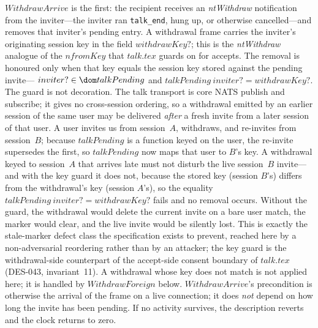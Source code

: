 \documentclass[a4paper,10pt,fleqn]{article}
\begin{document}
$WithdrawArrive$ is the first: the recipient receives an \emph{ntWithdraw}
notification from the inviter---the inviter ran \texttt{talk\_end}, hung up,
or otherwise cancelled---and removes that inviter's pending entry.  A
withdrawal frame carries the inviter's originating session key in the field
$withdrawKey?$; this is the \emph{ntWithdraw} analogue of the $nfromKey$ that
$talk.tex$ guards on for accepts.  The removal is honoured only when that key
equals the session key stored against the pending invite---%
$inviter? \in \dom talkPending$ and $talkPending~inviter? = withdrawKey?$.
The guard is not decoration.  The talk transport is core NATS publish and
subscribe; it gives no cross-session ordering, so a withdrawal emitted by an
earlier session of the same user may be delivered \emph{after} a fresh invite
from a later session of that user.  A user invites us from session~$A$,
withdraws, and re-invites from session~$B$; because $talkPending$ is a
function keyed on the user, the re-invite supersedes the first, so
$talkPending$ now maps that user to $B$'s key.  A withdrawal keyed to
session~$A$ that arrives late must not disturb the live session~$B$
invite---and with the key guard it does not, because the stored key (session
$B$'s) differs from the withdrawal's key (session $A$'s), so the equality
$talkPending~inviter? = withdrawKey?$ fails and no removal occurs.  Without
the guard, the withdrawal would delete the current invite on a bare user
match, the marker would clear, and the live invite would be silently lost.  This is
exactly the stale-marker defect class the specification exists to prevent,
reached here by a non-adversarial reordering rather than by an attacker; the
key guard is the withdrawal-side counterpart of the accept-side consent
boundary of $talk.tex$ (DES-043, invariant~11).  A withdrawal whose key does
not match is not applied here; it is handled by $WithdrawForeign$ below.
$WithdrawArrive$'s precondition is otherwise the arrival of the frame on a
live connection; it does \emph{not} depend on how long the invite has been
pending.  If no activity survives, the description reverts and the clock
returns to zero.
\end{document}
